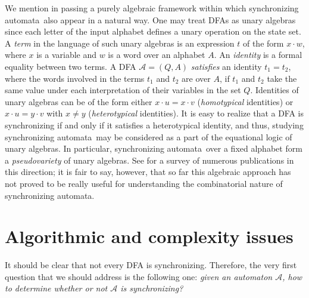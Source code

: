\documentclass{irmaart}
\newcommand{\sa}{synchronizing au\-tom\-a\-ta}
\theoremstyle{plain}
\begin{document}
We mention in passing a purely algebraic framework within which \sa\ also appear in a natural way. One may treat DFAs as unary algebras since each letter of the input alphabet
defines a unary operation on the state set. A \emph{term} in the language of such unary algebras is an expression $t$ of
the form $x\cdot w$, where $x$ is a variable and $w$ is a word over an alphabet $A$. An \emph{identity}
is a formal equality between two terms. A DFA $\mathcal{A}=(Q,A)$ \emph{satisfies} an identity $t_1=t_2$, where the words involved in the
terms $t_1$ and $t_2$ are over $A$, if $t_1$ and $t_2$ take the same value under each interpretation of their variables in the set $Q$.
Identities of unary algebras can be of the form either $x\cdot u=x\cdot v$ (\emph{homotypical} identities) or $x\cdot u=y\cdot v$ with $x\ne y$ (\emph{heterotypical} identities). It is easy to realize that a DFA is synchronizing if and only if it satisfies a heterotypical identity, and thus,
studying \sa\ may be considered as a part of the equational logic of unary algebras. In particular, \sa\ over a fixed alphabet form a
\emph{pseudovariety} of unary algebras. See \cite{Bogdanovic&Imreh&Ciric&Petkovic:1999} for a survey of numerous publications in this
direction; it is fair to say, however, that so far this algebraic approach has not proved to be really useful for understanding the
combinatorial nature of \sa.

\section{Algorithmic and complexity issues}
\label{KV:sec:algorithms&complexity}
It should be clear that not every DFA is synchronizing. Therefore, the very
first question that we should address is the following one: \emph{given an
automaton $\mathcal{A}$, how to determine whether or not $\mathcal{A}$ is
synchronizing?}
\end{document}
